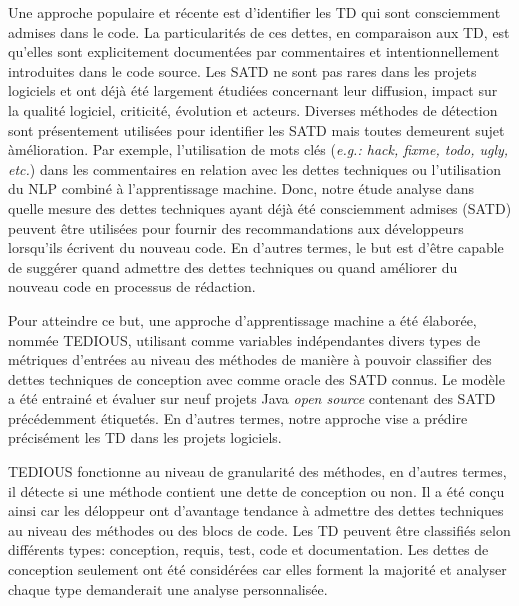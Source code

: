 Une approche populaire et r\'{e}cente est d'identifier les \ac{TD} qui sont consciemment admises dans le code. La particularit\'{e}s de ces dettes, en comparaison aux \ac{TD}, est qu'elles sont explicitement document\'{e}es par commentaires et intentionnellement introduites dans le code source. Les \ac{SATD} ne sont pas rares dans les projets logiciels et ont d\'{e}j\`{a} \'{e}t\'{e} largement \'{e}tudi\'{e}es concernant leur diffusion, impact sur la qualit\'{e} logiciel, criticit\'{e}, \'{e}volution et acteurs. Diverses m\'{e}thodes de d\'{e}tection sont pr\'{e}sentement utilis\'{e}es pour identifier les \ac{SATD} mais toutes demeurent sujet \`{a}m\'{e}lioration. Par exemple, l'utilisation de mots cl\'{e}s (\emph{e.g.: hack, fixme, todo, ugly, etc.}) dans les commentaires en relation avec les dettes techniques ou l'utilisation du \ac{NLP} combin\'{e} \`{a} l'apprentissage machine. Donc, notre \'{e}tude analyse dans quelle mesure des dettes techniques ayant d\'{e}j\`{a} \'{e}t\'{e} consciemment admises (\ac{SATD}) peuvent \^{e}tre utilis\'{e}es pour fournir des recommandations aux d\'{e}veloppeurs lorsqu'ils \'{e}crivent du nouveau code. En d'autres termes, le but est d'\^{e}tre capable de sugg\'{e}rer quand admettre des dettes techniques ou quand am\'{e}liorer du nouveau code en processus de r\'{e}daction. \par

Pour atteindre ce but, une approche d'apprentissage machine a \'{e}t\'{e} \'{e}labor\'{e}e, nomm\'{e}e \ac{TEDIOUS}, utilisant comme variables ind\'{e}pendantes divers types de m\'{e}triques d'entr\'{e}es au niveau des m\'{e}thodes de mani\`{e}re \`{a} pouvoir classifier des dettes techniques de conception avec comme oracle des \ac{SATD} connus. Le mod\`{e}le a \'{e}t\'{e} entrain\'{e} et \'{e}valuer sur neuf projets Java \emph{open source} contenant des \ac{SATD} pr\'{e}c\'{e}demment \'{e}tiquet\'{e}s. En d'autres termes, notre approche vise a pr\'{e}dire pr\'{e}cis\'{e}ment les \ac{TD} dans les projets logiciels. \par

\ac{TEDIOUS} fonctionne au niveau de granularit\'{e} des m\'{e}thodes, en d'autres termes, il d\'{e}tecte si une m\'{e}thode contient une dette de conception ou non. Il a \'{e}t\'{e} con\c{c}u ainsi car les d\'{e}loppeur ont d'avantage tendance \`{a} admettre des dettes techniques au niveau des m\'{e}thodes ou des blocs de code. Les \ac{TD} peuvent \^{e}tre classifi\'{e}s selon diff\'{e}rents types: conception, requis, test, code et documentation. Les dettes de conception seulement ont \'{e}t\'{e} consid\'{e}r\'{e}es car elles forment la majorit\'{e} et analyser chaque type demanderait une analyse personnalis\'{e}e. \par

